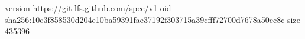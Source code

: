version https://git-lfs.github.com/spec/v1
oid sha256:10c3f858530d204e10ba59391fae37192f303715a39cfff72700d7678a50cc8c
size 435396
